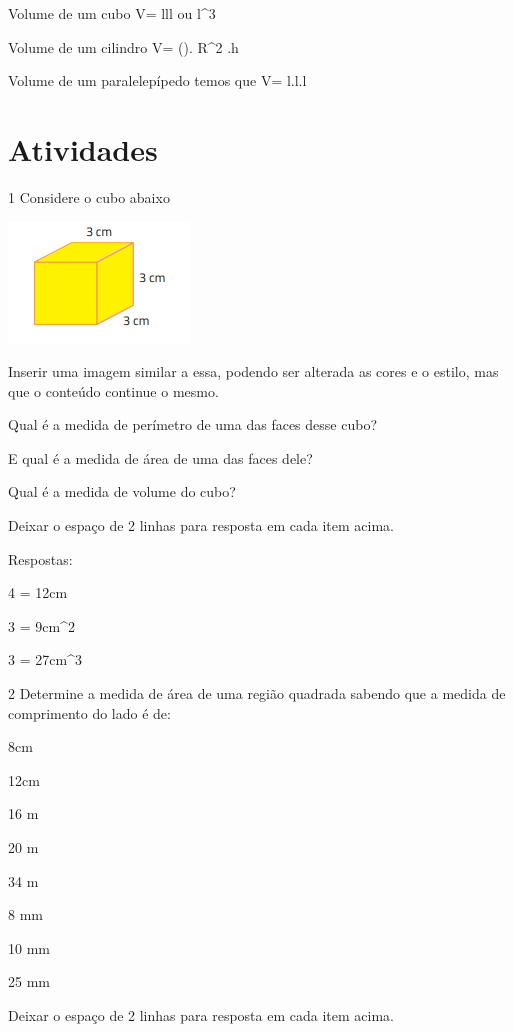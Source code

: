 Volume de um cubo V= l\times l\times l ou l^3

Volume de um cilindro V= (\Pi). R^2 .h

Volume de um paralelepípedo temos que V= l.l.l

\section{Atividades}

\num{1} Considere o cubo abaixo

\includegraphics[width=1\times 89583in,height=1\times 27083in]{./imgSAEB_8_MAT/media/image42.png}

Inserir uma imagem similar a essa, podendo ser alterada as cores e o
estilo, mas que o conteúdo continue o mesmo.

\item Qual é a medida de perímetro de uma das faces desse cubo?
\item E qual é a medida de área de uma das faces dele?
\item Qual é a medida de volume do cubo?

Deixar o espaço de 2 linhas para resposta em cada item acima.

Respostas:

\item 4 = 12cm
\item 3 = 9cm^2
\item 3 = 27cm^3

\num{2} Determine a medida de área de uma região quadrada sabendo que a
medida de comprimento do lado é de:

\item 8cm
\item 12cm
\item 16 m
\item 20 m
\item 34 m
\item 8 mm
\item 10 mm
\item 25 mm

Deixar o espaço de 2 linhas para resposta em cada item acima.

